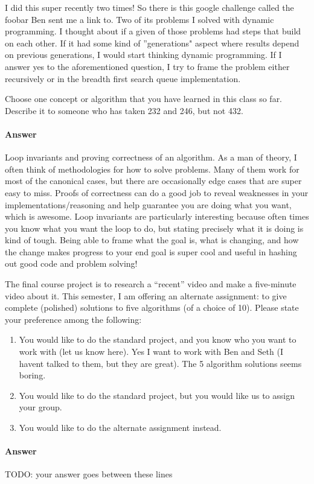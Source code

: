 \documentclass{article}
\begin{document}
I did this super recently two times! So there is this google challenge called
the foobar Ben sent me a link to. Two of its problems I solved with dynamic 
programming. I thought about if a given of those problems had steps that build on each other. If it had some kind of ''generations" aspect where results depend on previous
generations, I would start thinking dynamic programming. If I answer yes to the aforementioned question, I try to frame the
problem either recursively or in the breadth first search queue implementation.



\nextprob
{}

Choose one concept or algorithm that you have learned
in this class so far. Describe it to someone who has
taken 232 and 246, but not 432.

\paragraph{Answer}


Loop invariants and proving correctness of an algorithm. As a man of theory, I
often think of methodologies for how to solve problems. Many of them work for
most of the canonical cases, but there are occasionally edge cases that are super easy to miss. Proofs of correctness can do a good job to reveal weaknesses in your 
implementations/reasoning and help guarantee you are doing what you want, which
is awesome. Loop invariants are particularly interesting because often times
you know what you want the loop to do, but stating precisely what it is doing
is kind of tough. Being able to frame what the goal is, what is changing, and 
how the change makes progress to your end goal is super cool and useful in 
hashing out good code and problem solving!


\nextprob
{}

The final course project is to research a ``recent'' video and make a
five-minute video about it.  This semester, I am offering an alternate
assignment: to give complete (polished) solutions to five algorithms (of a
choice of 10).
Please state your preference among the following:

\begin{enumerate}
    \item You would like to do the standard project, and you know who you want
        to work with (let us know here).
		Yes I want to work with Ben and Seth (I havent talked to them,
		but they are great). The 5 algorithm solutions seems boring.
    \item You would like to do the standard project, but you would like us to
        assign your group.
    \item You would like to do the alternate assignment instead.
\end{enumerate}

\paragraph{Answer}


TODO: your answer goes between these lines

\end{document}
